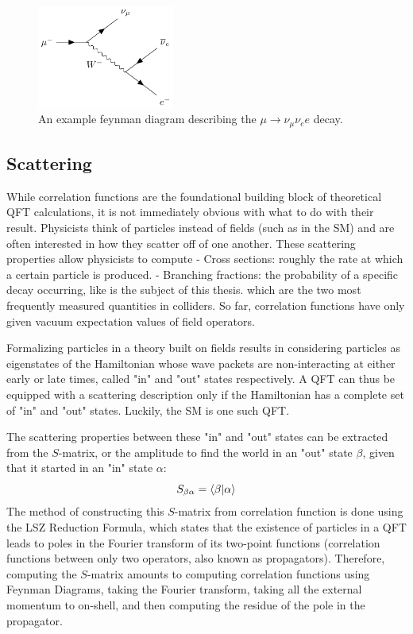 \begin{figure}[ht!]
    \centering
    \includegraphics[width=0.4\textwidth]{figures/chapter2/example_feynman_diagram.png}
    \caption{An example feynman diagram describing the $\mu \to \nu_\mu \nu_e e$ decay.}
    \label{fig:example_feynman_diagram}
\end{figure}



\subsection{Scattering}

While correlation functions are the foundational building block of theoretical QFT calculations, it is not immediately obvious with what to do with their result. Physicists think of particles instead of fields (such as in the SM) and are often interested in how they scatter off of one another. These scattering properties allow physicists to compute 
- Cross sections: roughly the rate at which a certain particle is produced.
- Branching fractions: the probability of a specific decay occurring, like is the subject of this thesis. 
which are the two most frequently measured quantities in colliders. So far, correlation functions have only given vacuum expectation values of field operators. 

Formalizing particles in a theory built on fields results in considering particles as eigenstates of the Hamiltonian whose wave packets are non-interacting at either early or late times, called "in" and "out" states respectively. A QFT can thus be equipped with a scattering description only if the Hamiltonian has a complete set of "in" and "out" states. Luckily, the SM is one such QFT.

The scattering properties between these "in" and "out" states can be extracted from the $S$-matrix, or the amplitude to find the world in an "out" state $\beta$, given that it started in an "in" state $\alpha$:
\begin{equation}
S_{\beta \alpha} = \braket{\beta|\alpha}   
\end{equation}
The method of constructing this $S$-matrix from correlation function is done using the LSZ Reduction Formula, which states that the existence of particles in a QFT leads to poles in the Fourier transform of its two-point functions (correlation functions between only two operators, also known as propagators). Therefore, computing the $S$-matrix amounts to computing correlation functions using Feynman Diagrams, taking the Fourier transform, taking all the external momentum to on-shell, and then computing the residue of the pole in the propagator. 

